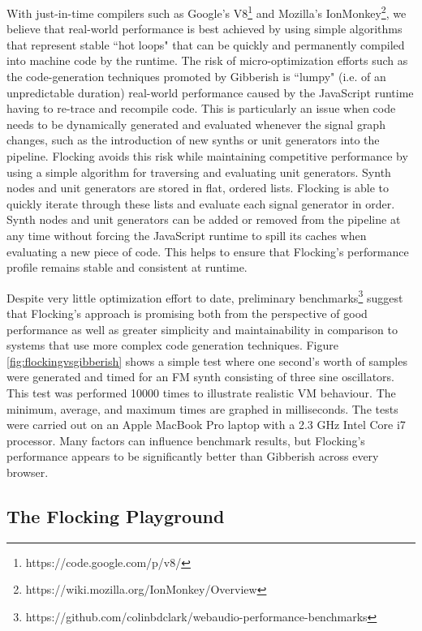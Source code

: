 \documentclass{article}
\begin{document}
With just-in-time compilers such as Google's V8\footnote{https://code.google.com/p/v8/} and Mozilla's IonMonkey\footnote{https://wiki.mozilla.org/IonMonkey/Overview}, we believe that real-world performance is best achieved by using simple algorithms that represent stable ``hot loops" that can be quickly and permanently  compiled into machine code by the runtime. The risk of micro-optimization efforts such as the code-generation techniques promoted by Gibberish is ``lumpy" (i.e. of an unpredictable duration) real-world performance caused by the JavaScript runtime having to re-trace and recompile code. This is particularly an issue when code needs to be dynamically generated and evaluated whenever the signal graph changes, such as the introduction of new synths or unit generators into the pipeline. Flocking avoids this risk while maintaining competitive performance by using a simple algorithm for traversing and evaluating unit generators. Synth nodes and unit generators are stored in flat, ordered lists. Flocking is able to quickly iterate through these lists and evaluate each signal generator in order. Synth nodes and unit generators can be added or removed from the pipeline at any time without forcing the JavaScript runtime to spill its caches when evaluating a new piece of code. This helps to ensure that Flocking's performance profile remains stable and consistent at runtime.

Despite very little optimization effort to date, preliminary benchmarks\footnote{https://github.com/colinbdclark/webaudio-performance-benchmarks} suggest that Flocking's approach is promising both from the perspective of good performance as well as greater simplicity and maintainability in comparison to systems that use more complex code generation techniques. Figure \ref{fig:flockingvsgibberish} shows a simple test where one second's worth of samples were generated and timed for an FM synth consisting of three sine oscillators. This test was performed 10000 times to illustrate realistic VM behaviour. The minimum, average, and maximum times are graphed in milliseconds. The tests were carried out on an Apple MacBook Pro laptop with a 2.3 GHz Intel Core i7 processor. Many factors can influence benchmark results, but Flocking's performance appears to be significantly better than Gibberish across every browser.

\subsection{The Flocking Playground}
\end{document}

